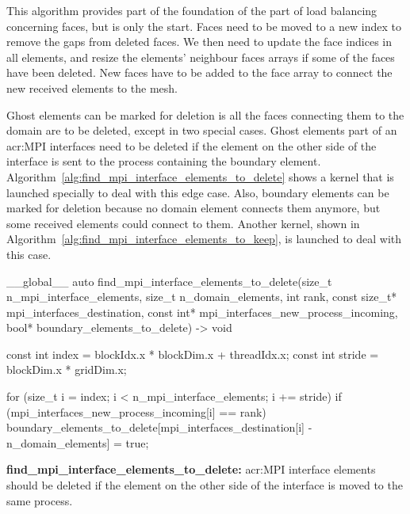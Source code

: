 This algorithm provides part of the foundation of the part of load balancing concerning faces, but
is only the start. Faces need to be moved to a new index to remove the gaps from deleted faces. We
then need to update the face indices in all elements, and resize the elements' neighbour faces
arrays if some of the faces have been deleted. New faces have to be added to the face array to
connect the new received elements to the mesh.

Ghost elements can be marked for deletion is all the faces connecting them to the domain are to be
deleted, except in two special cases. Ghost elements part of an \acrshort{acr:MPI} interfaces need
to be deleted if the element on the other side of the interface is sent to the process containing
the boundary element. Algorithm~\ref{alg:find_mpi_interface_elements_to_delete} shows a kernel that
is launched specially to deal with this edge case. Also, boundary elements can be marked for
deletion because no domain element connects them anymore, but some received elements could connect
to them. Another kernel, shown in Algorithm~\ref{alg:find_mpi_interface_elements_to_keep}, is
launched to deal with this case.

\begin{algorithm}[H]
    \begin{cuda}
        __global__
        auto find_mpi_interface_elements_to_delete(size_t n_mpi_interface_elements, 
                size_t n_domain_elements, int rank, 
                const size_t* mpi_interfaces_destination, 
                const int* mpi_interfaces_new_process_incoming, 
                bool* boundary_elements_to_delete) -> void {

            const int index = blockIdx.x * blockDim.x + threadIdx.x;
            const int stride = blockDim.x * gridDim.x;

            for (size_t i = index; i < n_mpi_interface_elements; i += stride) {
                if (mpi_interfaces_new_process_incoming[i] == rank) {
                    boundary_elements_to_delete[mpi_interfaces_destination[i] 
                                              - n_domain_elements] = true;
                }
            }
        }\end{cuda}
\caption{\textbf{find\_mpi\_interface\_elements\_to\_delete:} \Acrshort{acr:MPI} interface elements should be deleted if the element on the other side of the interface is moved to the same process.}\label{alg:find_mpi_interface_elements_to_delete}
\end{algorithm}

